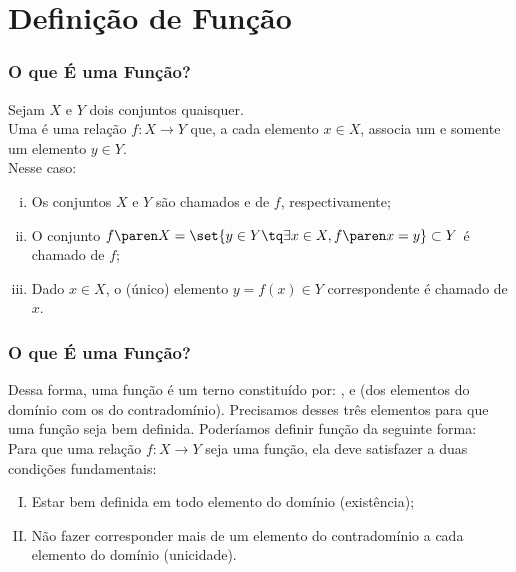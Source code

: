 \documentclass[brazil, notheorems, 10pt]{beamer}
\begin{document}
\section{Definição de Função}
\begin{frame} \frametitle{O que É uma Função?}
\begin{definicao}
Sejam $X$ e $Y$ dois conjuntos quaisquer.\\
Uma  é uma relação $f: X \to Y$ que, a cada elemento $x
\in X$, associa um e somente um elemento $y \in Y$.\\
Nesse caso:
\begin{enumerate}[(i)]
	\item Os conjuntos $X$ e $Y$ são chamados  e
	 de $f$, respectivamente;
	\item O conjunto $f\paren X = \set{y \in Y \tq \exists x \in X , f \paren x =
	y} \subset Y$ é chamado  de $f$;
	\item Dado $x \in X$, o (único) elemento $y = f(x) \in Y$
	correspondente é chamado  de $x$.
\end{enumerate}
\end{definicao}

\end{frame}


\begin{frame} \frametitle{O que É uma Função?} %

Dessa forma, uma função é um terno constituído por: ,
 e  (dos elementos do
domínio com os do contradomínio). Precisamos desses três elementos
para que uma função seja bem definida. Poderíamos definir
função da seguinte forma: \\
Para que uma relação $f: X \to Y$ seja
uma função, ela deve satisfazer a duas condições fundamentais:
\begin{enumerate}[(I)]
	\item Estar bem definida em todo elemento do domínio (existência);
	\item Não fazer corresponder mais de um elemento do contradomínio
	a cada elemento do domínio (unicidade).
\end{enumerate}

\end{frame}

\end{document}
